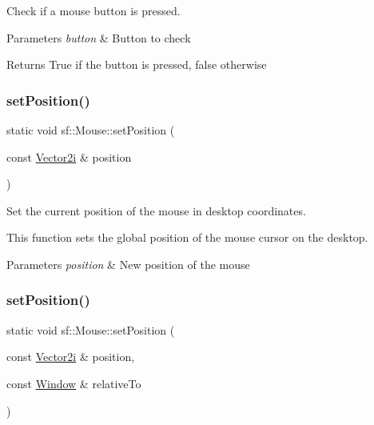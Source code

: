 Check if a mouse button is pressed. 


\begin{DoxyParams}{Parameters}
{\em button} & Button to check\\
\hline
\end{DoxyParams}
\begin{DoxyReturn}{Returns}
True if the button is pressed, false otherwise 
\end{DoxyReturn}
\mbox{\label{classsf_1_1_mouse_a1222e16c583be9e3d176d86e0b7817d7}} 
\subsubsection{\texorpdfstring{set\+Position()}{setPosition()}\hspace{0.1cm}{\footnotesize\ttfamily [1/2]}}
{\footnotesize\ttfamily static void sf\+::\+Mouse\+::set\+Position (\begin{DoxyParamCaption}\item[{const \hyperlink{classsf_1_1_vector2}{Vector2i} \&}]{position }\end{DoxyParamCaption})\hspace{0.3cm}{\ttfamily [static]}}



Set the current position of the mouse in desktop coordinates. 

This function sets the global position of the mouse cursor on the desktop.


\begin{DoxyParams}{Parameters}
{\em position} & New position of the mouse \\
\hline
\end{DoxyParams}
\mbox{\label{classsf_1_1_mouse_ad9b16ec7041531315f06b26b413dfea8}} 
\subsubsection{\texorpdfstring{set\+Position()}{setPosition()}\hspace{0.1cm}{\footnotesize\ttfamily [2/2]}}
{\footnotesize\ttfamily static void sf\+::\+Mouse\+::set\+Position (\begin{DoxyParamCaption}\item[{const \hyperlink{classsf_1_1_vector2}{Vector2i} \&}]{position,  }\item[{const \hyperlink{classsf_1_1_window}{Window} \&}]{relative\+To }\end{DoxyParamCaption})\hspace{0.3cm}{\ttfamily [static]}}



